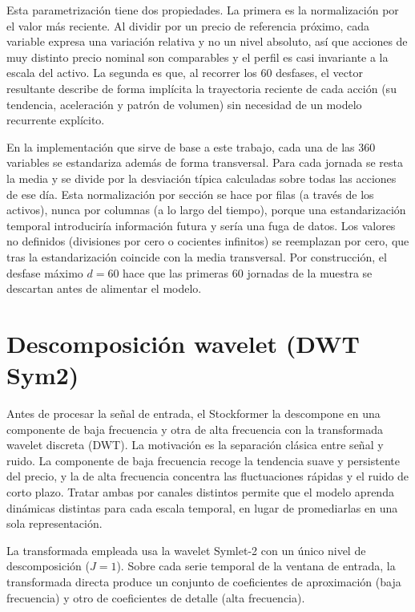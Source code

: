 Esta parametrización tiene dos propiedades. La primera es la normalización por el valor
más reciente. Al dividir por un precio de referencia próximo, cada variable expresa una
variación relativa y no un nivel absoluto, así que acciones de muy distinto precio nominal
son comparables y el perfil es casi invariante a la escala del activo. La segunda es que,
al recorrer los 60 desfases, el vector resultante describe de forma implícita la
trayectoria reciente de cada acción (su tendencia, aceleración y patrón de volumen) sin
necesidad de un modelo recurrente explícito.

En la implementación que sirve de base a este trabajo, cada una de las 360 variables se
estandariza además de forma transversal. Para cada jornada se resta la media y se divide
por la desviación típica calculadas sobre todas las acciones de ese día. Esta
normalización por sección se hace por filas (a través de los activos), nunca por columnas
(a lo largo del tiempo), porque una estandarización temporal introduciría información
futura y sería una fuga de datos. Los valores no definidos (divisiones por cero o
cocientes infinitos) se reemplazan por cero, que tras la estandarización coincide con la
media transversal. Por construcción, el desfase máximo $d=60$ hace que las primeras 60
jornadas de la muestra se descartan antes de alimentar el modelo.

\section{Descomposición wavelet (DWT Sym2)}\label{sec:dwt}

Antes de procesar la señal de entrada, el Stockformer la descompone en una
componente de baja frecuencia y otra de alta frecuencia con la transformada wavelet
discreta (DWT). La motivación es la separación clásica entre señal y ruido. La componente
de baja frecuencia recoge la tendencia suave y persistente del precio, y la de alta
frecuencia concentra las fluctuaciones rápidas y el ruido de corto plazo. Tratar ambas por
canales distintos permite que el modelo aprenda dinámicas distintas para cada escala
temporal, en lugar de promediarlas en una sola representación.

La transformada empleada usa la wavelet Symlet-2 con un único nivel de descomposición
($J=1$). Sobre cada serie temporal de la ventana de entrada, la transformada directa
produce un conjunto de coeficientes de aproximación (baja frecuencia) y otro de
coeficientes de detalle (alta frecuencia).

